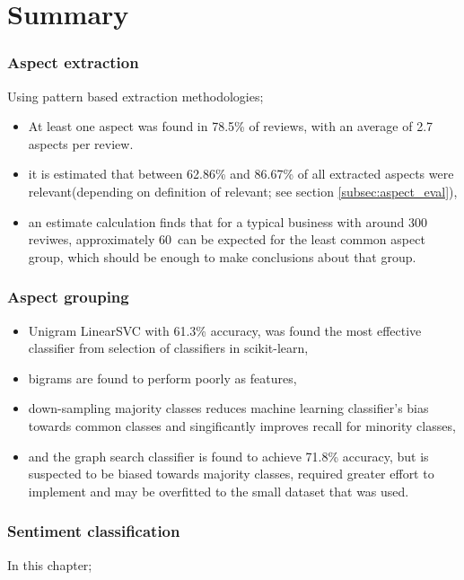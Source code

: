 \documentclass[a4paper,11pt]{kth-mag}
\newcommand{\numValueAspects}{60}
\begin{document}


\chapter{Summary}

\subsection{Aspect extraction}
Using pattern based extraction methodologies;
\begin{itemize}
\item At least one aspect was found in 78.5\% of reviews, with an average of 2.7 aspects per review.

\item it is estimated that between 62.86\% and 86.67\% of all extracted aspects were relevant(depending on definition of relevant; see section \ref{subsec:aspect_eval}),

\item an estimate calculation finds that for a typical business with around 300 reviwes,
approximately \numValueAspects~can be expected for the least common aspect group, which should be enough to make conclusions about that group.
\end{itemize}


\subsection{Aspect grouping}
\begin{itemize}
\item Unigram LinearSVC with 61.3\% accuracy, was found the most effective classifier from selection of classifiers in scikit-learn,
\item bigrams are found to perform poorly as features,
\item down-sampling majority classes reduces machine learning classifier's bias towards common classes and
  singificantly improves recall for minority classes,
\item and the graph search classifier is found to achieve 71.8\% accuracy, but is suspected to be biased towards
  majority classes, required greater effort to implement and may be overfitted to the small dataset that was used.

\end{itemize}


\subsection{Sentiment classification}
In this chapter;
\end{document}
